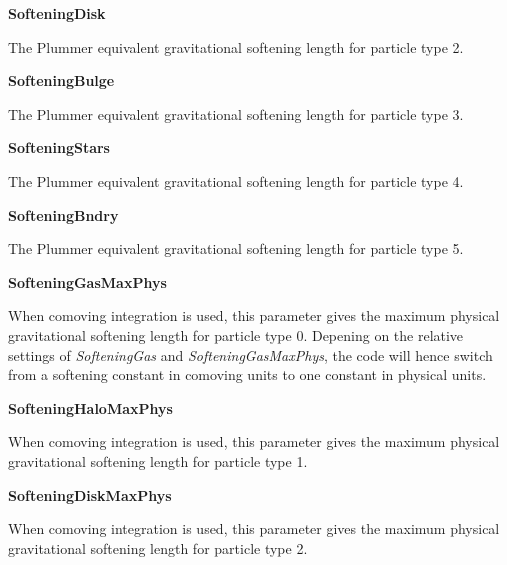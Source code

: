 \begin{DoxyItemize}
\item {\bfseries \-Softening\-Disk} \par
 \-The \-Plummer equivalent gravitational softening length for particle type 2.
\end{DoxyItemize}


\begin{DoxyItemize}
\item {\bfseries \-Softening\-Bulge} \par
 \-The \-Plummer equivalent gravitational softening length for particle type 3.
\end{DoxyItemize}


\begin{DoxyItemize}
\item {\bfseries \-Softening\-Stars} \par
 \-The \-Plummer equivalent gravitational softening length for particle type 4.
\end{DoxyItemize}


\begin{DoxyItemize}
\item {\bfseries \-Softening\-Bndry} \par
 \-The \-Plummer equivalent gravitational softening length for particle type 5.
\end{DoxyItemize}


\begin{DoxyItemize}
\item {\bfseries \-Softening\-Gas\-Max\-Phys} \par
 \-When comoving integration is used, this parameter gives the maximum physical gravitational softening length for particle type 0. \-Depening on the relative settings of {\itshape \-Softening\-Gas\/} and {\itshape \-Softening\-Gas\-Max\-Phys\/}, the code will hence switch from a softening constant in comoving units to one constant in physical units.
\end{DoxyItemize}


\begin{DoxyItemize}
\item {\bfseries \-Softening\-Halo\-Max\-Phys} \par
 \-When comoving integration is used, this parameter gives the maximum physical gravitational softening length for particle type 1.
\end{DoxyItemize}


\begin{DoxyItemize}
\item {\bfseries \-Softening\-Disk\-Max\-Phys} \par
 \-When comoving integration is used, this parameter gives the maximum physical gravitational softening length for particle type 2.
\end{DoxyItemize}


